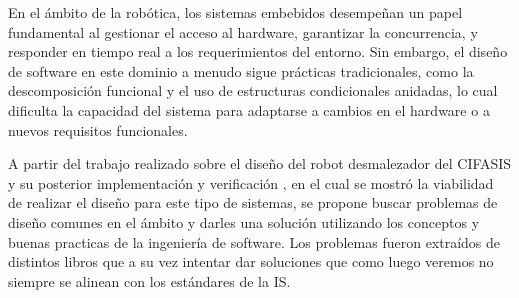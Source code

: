 %
%

En el ámbito de la robótica, los sistemas embebidos desempeñan un papel fundamental al gestionar el acceso al hardware, garantizar la concurrencia, y responder en tiempo real a los requerimientos del entorno. Sin embargo, el diseño de software en este dominio a menudo sigue prácticas tradicionales, como la descomposición funcional y el uso de estructuras condicionales anidadas, lo cual dificulta la capacidad del sistema para adaptarse a cambios en el hardware o a nuevos requisitos funcionales.

A partir del trabajo realizado sobre el diseño del robot desmalezador del CIFASIS y su posterior implementación y verificación \cite{paperPomponio}, en el cual se mostró la viabilidad de realizar el diseño para este tipo de sistemas, se propone buscar problemas de diseño comunes en el ámbito y darles una solución utilizando los conceptos y buenas practicas de la ingeniería de software. Los problemas fueron extraídos de distintos libros \cite{douglass}\cite{elecia} que a su vez intentar dar soluciones que como luego veremos no siempre se alinean con los estándares de la IS.
